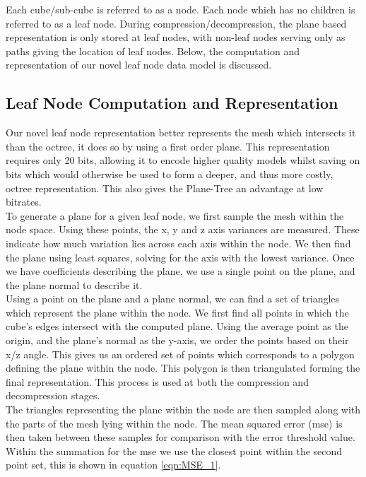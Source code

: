 Each cube/sub-cube is referred to as a node. Each node which has no children is referred to as a leaf node. During compression/decompression, the plane based representation is only stored at leaf nodes, with non-leaf nodes serving only as paths giving the location of leaf nodes. Below, the computation and representation of our novel leaf node data model is discussed. \\

\subsection{Leaf Node Computation and Representation}
\label{NRep}

Our novel leaf node representation better represents the mesh which intersects it than the octree, it does so by using a first order plane. This representation requires only 20 bits, allowing it to encode higher quality models whilst saving on bits which would otherwise be used to form a deeper, and thus more costly, octree representation. This also gives the Plane-Tree an advantage at low bitrates. \\

To generate a plane for a given leaf node, we first sample the mesh within the node space. Using these points, the x, y and z axis variances are measured. These indicate how much variation lies across each axis within the node. We then find the plane using least squares, solving for the axis with the lowest variance. Once we have coefficients describing the plane, we use a single point on the plane, and the plane normal to describe it. \\

Using a point on the plane and a plane normal, we can find a set of triangles which represent the plane within the node. We first find all points in which the cube's edges intersect with the computed plane. Using the average point as the origin, and the plane's normal as the y-axis, we order the points based on their x/z angle. This gives us an ordered set of points which corresponds to a polygon defining the plane within the node. This polygon is then triangulated forming the final representation. This process is used at both the compression and decompression stages. \\

The triangles representing the plane within the node are then sampled along with the parts of the mesh lying within the node. The mean squared error (mse) is then taken between these samples for comparison with the error threshold value. Within the summation for the mse we use the closest point within the second point set, this is shown in equation \ref{eqn:MSE_1}.

